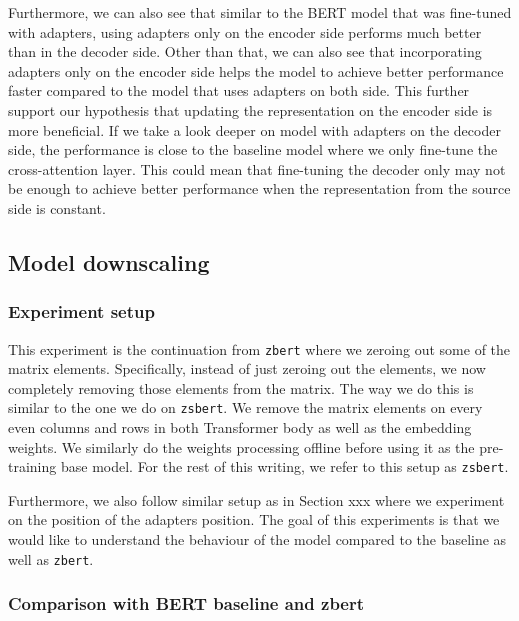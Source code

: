 Furthermore, we can also see that similar to the BERT model that was fine-tuned with adapters, using adapters only on the encoder side performs much better than in the decoder side. Other than that, we can also see that incorporating adapters only on the encoder side helps the model to achieve better performance faster compared to the model that uses adapters on both side. This further support our hypothesis that updating the representation on the encoder side is more beneficial. If we take a look deeper on model with adapters on the decoder side, the performance is close to the baseline model where we only fine-tune the cross-attention layer. This could mean that fine-tuning the decoder only may not be enough to achieve better performance when the representation from the source side is constant.

\subsection{Model downscaling}
\subsubsection{Experiment setup}
This experiment is the continuation from \texttt{zbert} where we zeroing out some of the matrix elements. Specifically, instead of just zeroing out the elements, we now completely removing those elements from the matrix. The way we do this is similar to the one we do on \texttt{zsbert}. We remove the matrix elements on every even columns and rows in both Transformer body as well as the embedding weights. We similarly do the weights processing offline before using it as the pre-training base model. For the rest of this writing, we refer to this setup as \texttt{zsbert}.

Furthermore, we also follow similar setup as in Section xxx where we experiment on the position of the adapters position. The goal of this experiments is that we would like to understand the behaviour of the model compared to the baseline as well as \texttt{zbert}.

\subsubsection{Comparison with BERT baseline and zbert}

